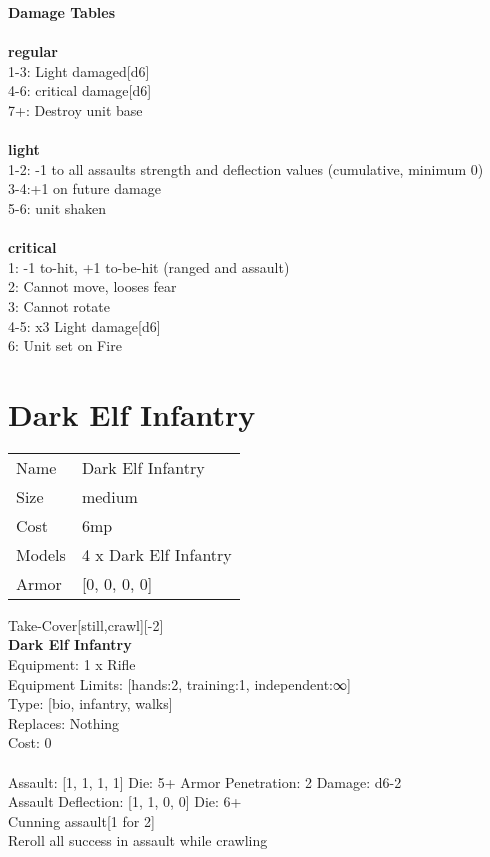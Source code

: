 {\bf Damage Tables} \\
\ \\ {\bf regular } \\
1-3: Light damaged[d6] \\
4-6: critical damage[d6] \\
7+: Destroy unit base \\
\ \\ {\bf light } \\
1-2: -1 to all assaults strength and deflection values (cumulative, minimum 0) \\
3-4:+1 on future damage \\
5-6: unit shaken \\
\ \\ {\bf critical } \\
1: -1 to-hit, +1 to-be-hit (ranged and assault) \\
2: Cannot move, looses fear \\
3: Cannot rotate \\
4-5: x3 Light damage[d6] \\
6: Unit set on Fire \\










\pagebreak\pagebreak

\section{ Dark Elf Infantry }

\begin{tabular}{ll}
  Name & Dark Elf Infantry \\
  Size & medium\\
  Cost & 6mp\\
  Models & 4 x Dark Elf Infantry\\
  Armor & [0, 0, 0, 0]\\
\end{tabular}

\noindent Take-Cover[still,crawl][-2]\\ 


{\bf Dark Elf Infantry } \\
Equipment: 1 x Rifle \\
Equipment Limits: [hands:2, training:1, independent:∞] \\
Type: [bio, infantry, walks] \\
Replaces: Nothing \\
Cost: 0\\
\ \\
Assault: [1, 1, 1, 1] Die: 5+ Armor Penetration: 2 Damage: d6-2 \\
Assault Deflection: [1, 1, 0, 0] Die: 6+\\
\indent Cunning assault[1 for 2]\\ 
Reroll all success in assault while crawling\\ 
 
